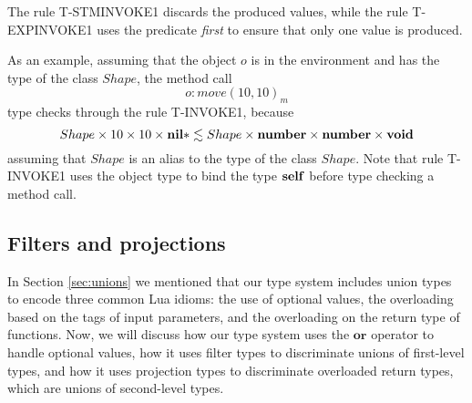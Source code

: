 The rule \textsc{T-STMINVOKE1} discards the produced values,
while the rule \textsc{T-EXPINVOKE1} uses the predicate \emph{first} to
ensure that only one value is produced.

As an example, assuming that the object $o$ is in the environment and
has the type of the class $Shape$, the method call
\[
o{:}move(10, 10)_{m}
\]
type checks through the rule \textsc{T-INVOKE1}, because
\[
Shape \times 10 \times 10 \times \mathbf{nil}{*} \lesssim Shape \times \mathbf{number} \times \mathbf{number} \times \mathbf{void}
\]
assuming that $Shape$ is an alias to the type of the class $Shape$.
Note that rule \textsc{T-INVOKE1} uses the object type to bind
the type $\mathbf{self}$ before type checking a method call.

\subsection{Filters and projections}
\label{sec:fap}

In Section \ref{sec:unions} we mentioned that our type system 
includes union types to encode three common Lua idioms:
the use of optional values, the overloading based on the tags of
input parameters, and the overloading on the return type of functions.
Now, we will discuss how our type system uses the $\mathbf{or}$
operator to handle optional values, how it uses filter types to
discriminate unions of first-level types, and how it uses
projection types to discriminate overloaded return types,
which are unions of second-level types.

